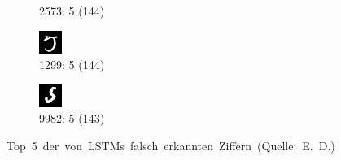 \documentclass[
	a4paper,
	12pt,
	ngerman,
	oneside
]{scrreprt}											%
\begin{document}
\begin{figure}[h]
\begin{subfigure}[t]{.19\linewidth}
					\caption{2573: 5 (144)}
				\end{subfigure}
				\begin{subfigure}[t]{.19\linewidth}
					\centering
					\includegraphics[height=0.6\linewidth]{imagesAndGraphData/top5LSTM/5-1299.png}
					\caption{1299: 5 (144)}
				\end{subfigure}
				\begin{subfigure}[t]{.19\linewidth}
					\centering
					\includegraphics[height=0.6\linewidth]{imagesAndGraphData/top5LSTM/5-9982.png}
					\caption{9982: 5 (143)}
				\end{subfigure}
				
				\vspace*{-2mm}
				\caption{\mbox{Top 5 der von LSTMs falsch erkannten Ziffern (Quelle: E. D.)}}\label{top5LSTM}
			\end{figure}
			
\end{document}
